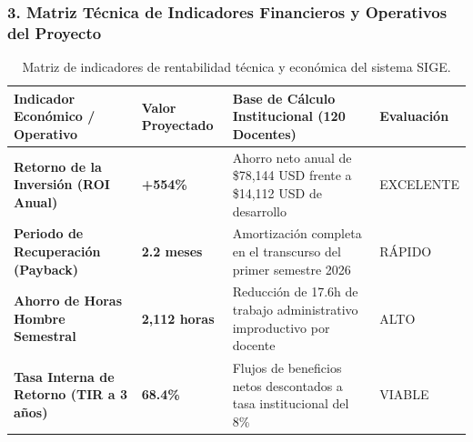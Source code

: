 \documentclass[12pt,a4paper]{article}
\begin{document}
\subsubsection*{3. Matriz Técnica de Indicadores Financieros y Operativos del Proyecto}
\begin{table}[H]
\centering
\small
\renewcommand{\arraystretch}{1.2}
\begin{tabularx}{\textwidth}{|>{\hsize=1.0\hsize\raggedright\arraybackslash\bfseries\footnotesize}X|>{\hsize=0.8\hsize\centering\arraybackslash\footnotesize}X|>{\hsize=1.6\hsize\raggedright\arraybackslash\footnotesize}X|>{\hsize=0.6\hsize\centering\arraybackslash\footnotesize}X|}
\hline
\rowcolor{tableheader}
\textbf{Indicador Económico / Operativo} & \textbf{Valor Proyectado} & \textbf{Base de Cálculo Institucional (120 Docentes)} & \textbf{Evaluación} \\
\hline
Retorno de la Inversión (ROI Anual) & \textbf{+554\%} & Ahorro neto anual de \$78,144 USD frente a \$14,112 USD de desarrollo & EXCELENTE \\
\hline
Periodo de Recuperación (Payback) & \textbf{2.2 meses} & Amortización completa en el transcurso del primer semestre 2026 & RÁPIDO \\
\hline
Ahorro de Horas Hombre Semestral & \textbf{2,112 horas} & Reducción de 17.6h de trabajo administrativo improductivo por docente & ALTO \\
\hline
Tasa Interna de Retorno (TIR a 3 años) & \textbf{68.4\%} & Flujos de beneficios netos descontados a tasa institucional del 8\% & VIABLE \\
\hline
\end{tabularx}
\caption{Matriz de indicadores de rentabilidad técnica y económica del sistema SIGE.}
\end{table}
\end{document}
